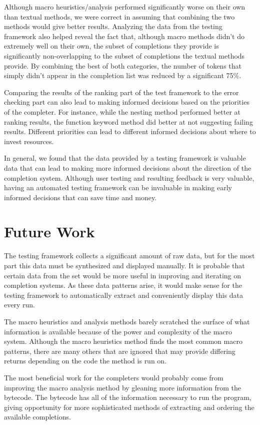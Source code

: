 \documentclass[ms,electronic,twosidetoc,letterpaper,chaptercenter,parttop,lol,lof,lot]{byumsphd}
\begin{document}
Although macro heuristics/analysis performed significantly worse on their own than textual methods, we were correct in assuming that combining the two methods would give better results.
Analyzing the data from the testing framework also helped reveal the fact that, although macro methods didn't do extremely well on their own, the subset of completions they provide is significantly non-overlapping to the subset of completions the textual methods provide.
By combining the best of both categories, the number of tokens that simply didn't appear in the completion list was reduced by a significant 75\%.

Comparing the results of the ranking part of the test framework to the error checking part can also lead to making informed decisions based on the priorities of the completer.
For instance, while the nesting method performed better at ranking results, the function keyword method did better at not suggesting failing results.
Different priorities can lead to different informed decisions about where to invest resources.

In general, we found that the data provided by a testing framework is valuable data that can lead to making more informed decisions about the direction of the completion system.
Although user testing and resulting feedback is very valuable, having an automated testing framework can be invaluable in making early informed decisions that can save time and money.

\section{Future Work}

The testing framework collects a significant amount of raw data, but for the most part this data must be synthesized and displayed manually.
It is probable that certain data from the set would be more useful in improving and iterating on completion systems.
As these data patterns arise, it would make sense for the testing framework to automatically extract and conveniently display this data every run.

The macro heuristics and analysis methods barely scratched the surface of what information is available because of the power and complexity of the macro system.
Although the macro heuristics method finds the most common macro patterns, there are many others that are ignored that may provide differing returns depending on the code the method is run on.

The most beneficial work for the completers would probably come from improving the macro analysis method by gleaning more information from the bytecode.
The bytecode has all of the information necessary to run the program, giving opportunity for more sophisticated methods of extracting and ordering the available completions.



\end{document}
